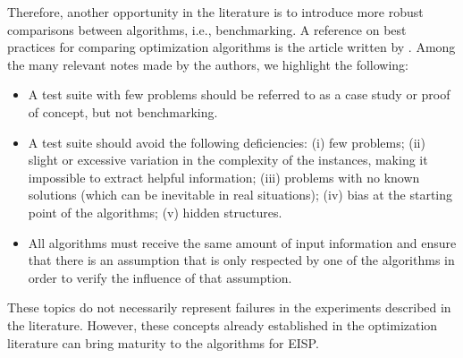 		Therefore, another opportunity in the literature is to introduce more robust comparisons between algorithms, i.e., benchmarking. A reference on best practices for comparing optimization algorithms is the article written by \cite{beiranvand2017best}. Among the many relevant notes made by the authors, we highlight the following:
		
		\begin{itemize}
			\item A test suite with few problems should be referred to as a case study or proof of concept, but not benchmarking.
			\item A test suite should avoid the following deficiencies: (i) few problems; (ii) slight or excessive variation in the complexity of the instances, making it impossible to extract helpful information; (iii) problems with no known solutions (which can be inevitable in real situations); (iv) bias at the starting point of the algorithms; (v) hidden structures.
			\item All algorithms must receive the same amount of input information and ensure that there is an assumption that is only respected by one of the algorithms in order to verify the influence of that assumption.
		\end{itemize}
		
		These topics do not necessarily represent failures in the experiments described in the literature. However, these concepts already established in the optimization literature can bring maturity to the algorithms for EISP.
		
